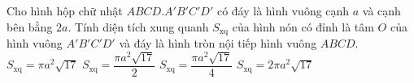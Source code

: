 \begin{ex}
	Cho hình hộp chữ nhật $ABCD.A'B'C'D'$ có đáy là hình vuông cạnh $a$ và cạnh bên bằng $2a$. Tính diện tích xung quanh $S_{\mathrm{xq}}$ của hình nón có đỉnh là tâm $O$ của hình vuông $A'B'C'D'$ và đáy là hình tròn nội tiếp hình vuông $ABCD$. 
	\choice
	{$S_{\mathrm{xq}}=\pi a^2\sqrt{17}$}
	{$S_{\mathrm{xq}}=\dfrac{\pi a^2\sqrt{17}}{2}$}
	{\True $S_{\mathrm{xq}}=\dfrac{\pi a^2\sqrt{17}}{4}$}
	{$S_{\mathrm{xq}}=2\pi a^2\sqrt{17}$}
\end{ex}
